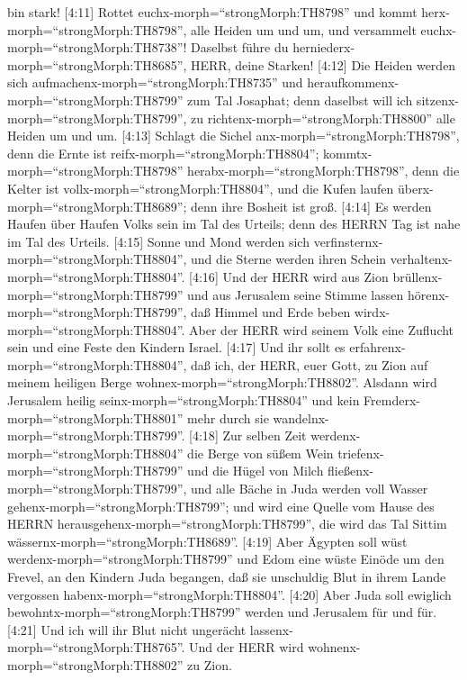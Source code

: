 bin stark!  {[}4:11{]} Rottet
euchx-morph=``strongMorph:TH8798'' und kommt
herx-morph=``strongMorph:TH8798'', alle Heiden um und um, und versammelt
euchx-morph=``strongMorph:TH8738''! Daselbst führe du
herniederx-morph=``strongMorph:TH8685'', HERR, deine Starken!
 {[}4:12{]} Die Heiden werden sich
aufmachenx-morph=``strongMorph:TH8735'' und
heraufkommenx-morph=``strongMorph:TH8799'' zum Tal Josaphat; denn
daselbst will ich sitzenx-morph=``strongMorph:TH8799'', zu
richtenx-morph=``strongMorph:TH8800'' alle Heiden um und um.
 {[}4:13{]} Schlagt die Sichel
anx-morph=``strongMorph:TH8798'', denn die Ernte ist
reifx-morph=``strongMorph:TH8804''; kommtx-morph=``strongMorph:TH8798''
herabx-morph=``strongMorph:TH8798'', denn die Kelter ist
vollx-morph=``strongMorph:TH8804'', und die Kufen laufen
überx-morph=``strongMorph:TH8689''; denn ihre Bosheit ist groß.
 {[}4:14{]} Es werden Haufen über Haufen Volks sein im Tal
des Urteils; denn des HERRN Tag ist nahe im Tal des Urteils.
 {[}4:15{]} Sonne und Mond werden sich
verfinsternx-morph=``strongMorph:TH8804'', und die Sterne werden ihren
Schein verhaltenx-morph=``strongMorph:TH8804''.  {[}4:16{]}
Und der HERR wird aus Zion brüllenx-morph=``strongMorph:TH8799'' und aus
Jerusalem seine Stimme lassen hörenx-morph=``strongMorph:TH8799'', daß
Himmel und Erde beben wirdx-morph=``strongMorph:TH8804''. Aber der HERR
wird seinem Volk eine Zuflucht sein und eine Feste den Kindern Israel.
 {[}4:17{]} Und ihr sollt es
erfahrenx-morph=``strongMorph:TH8804'', daß ich, der HERR, euer Gott, zu
Zion auf meinem heiligen Berge wohnex-morph=``strongMorph:TH8802''.
Alsdann wird Jerusalem heilig seinx-morph=``strongMorph:TH8804'' und
kein Fremderx-morph=``strongMorph:TH8801'' mehr durch sie
wandelnx-morph=``strongMorph:TH8799''.  {[}4:18{]} Zur
selben Zeit werdenx-morph=``strongMorph:TH8804'' die Berge von süßem
Wein triefenx-morph=``strongMorph:TH8799'' und die Hügel von Milch
fließenx-morph=``strongMorph:TH8799'', und alle Bäche in Juda werden
voll Wasser gehenx-morph=``strongMorph:TH8799''; und wird eine Quelle
vom Hause des HERRN herausgehenx-morph=``strongMorph:TH8799'', die wird
das Tal Sittim wässernx-morph=``strongMorph:TH8689''. 
{[}4:19{]} Aber Ägypten soll wüst werdenx-morph=``strongMorph:TH8799''
und Edom eine wüste Einöde um den Frevel, an den Kindern Juda begangen,
daß sie unschuldig Blut in ihrem Lande vergossen
habenx-morph=``strongMorph:TH8804''.  {[}4:20{]} Aber Juda
soll ewiglich bewohntx-morph=``strongMorph:TH8799'' werden und Jerusalem
für und für.  {[}4:21{]} Und ich will ihr Blut nicht
ungerächt lassenx-morph=``strongMorph:TH8765''. Und der HERR wird
wohnenx-morph=``strongMorph:TH8802'' zu Zion.
